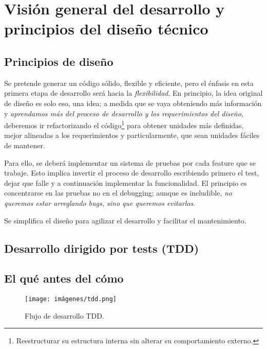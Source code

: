 
\section{Visión general del desarrollo y principios del diseño
técnico}\label{principios:vision-general-desarrollo}

\subsection{Principios de diseño}\label{principios:principios-de-diseno} Se
pretende generar un código sólido, flexible y eficiente, pero el énfasis en
esta primera etapa de desarrollo será hacia la \emph{flexibilidad}. En
principio, la idea original de diseño es solo eso, una idea; a medida que se
vaya obteniendo más información y \emph{aprendamos más del proceso de
desarrollo y los requerimientos del diseño}, deberemos ir refactorizando el
código\footnote{Reestructurar su estructura interna sin alterar su
comportamiento externo.} para obtener unidades más definidas, mejor alineadas a
los requerimientos y particularmente, que sean unidades fáciles de mantener.

Para ello, se deberá implementar un sistema de pruebas por cada feature que se
trabaje. Esto implica invertir el proceso de desarrollo escribiendo primero el
test, dejar que falle y a continuación implementar la funcionalidad. El
principio es concentrarse en las pruebas no en el
\foreignlanguage{english}{debugging}; aunque es ineludible, \emph{no queremos
estar arreglando bugs, sino que queremos evitarlos}.

Se simplifica el diseño para agilizar el desarrollo y facilitar el
mantenimiento.

\subsection{Desarrollo dirigido por tests (TDD)}\label{principios:TDD}
\subsection*{El qué antes del cómo}

\begin{figure}[ht] \centering
\texttt{[image: imágenes/tdd.png]} \caption{Flujo de
desarrollo TDD.} \end{figure}

